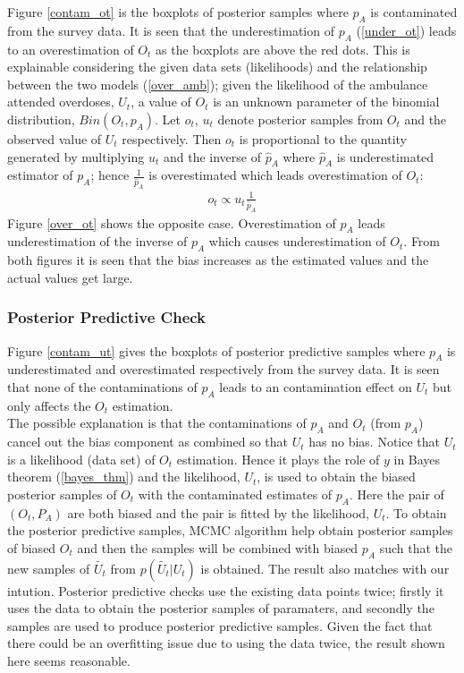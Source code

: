 \documentclass[12pt]{article}
\begin{document}
\normalsize 
Figure \ref{contam_ot} is the boxplots of posterior samples where $p_A$ is contaminated from the survey data. It is seen that the underestimation of $p_A$ (\ref{under_ot}) leads to an overestimation of $O_t$ as the boxplots are above the red dots. This is explainable considering the given data sets (likelihoods) and the relationship between the two models (\ref{over_amb}); given the likelihood of the ambulance attended overdoses, $U_t$, a value of $O_t$ is an unknown parameter of the binomial distribution, $Bin(O_t, p_A)$. Let $o_t$, $u_t$ denote posterior samples from $O_t$ and the observed value of $U_t$ respectively. Then $o_t$ is proportional to the quantity generated by multiplying $u_t$ and the inverse of $\hat{p}_{A}$ where $\hat{p}_{A}$ is underestimated estimator of $p_A$; hence $\frac{1}{\hat{p}_{A}}$ is overestimated which leads overestimation of $O_t$:
\begin{equation}
\label{ot.how.made}
\begin{aligned}
o_t \propto u_t \frac{1}{\hat{p}_{A}}
\end{aligned}
\end{equation}
Figure \ref{over_ot} shows the opposite case. Overestimation of $p_A$ leads underestimation of the inverse of $p_A$ which causes underestimation of $O_t$. From both figures it is seen that the bias increases as the estimated values and the actual values get large.\\

\subsubsection{Posterior Predictive Check}

Figure \ref{contam_ut} gives the boxplots of posterior predictive samples where $p_A$ is underestimated and overestimated respectively from the survey data. It is seen that none of the contaminations of $p_A$ leads to an contamination effect on $U_t$ but only affects the $O_t$ estimation.\\

The possible explanation is that the contaminations of  $p_A$ and $O_t$ (from $p_A$) cancel out the bias component as combined so that $U_t$ has no bias. Notice that $U_t$ is a likelihood (data set) of $O_t$ estimation. Hence it plays the role of $y$ in Bayes theorem (\ref{bayes_thm}) and the likelihood, $U_t$, is used to obtain the biased posterior samples of $O_t$ with the contaminated estimates of $p_A$. Here the pair of $(O_t, P_A)$ are both biased and the pair is fitted by the likelihood, $U_t$. To obtain the posterior predictive samples, MCMC algorithm help obtain posterior samples of biased $O_t$ and then the samples will be combined with biased $p_A$ such that the new samples of $\tilde{U_t}$ from $p(\tilde{U_t}|{U_t})$ is obtained.  The result also matches with our intution. Posterior predictive checks use the existing data points twice; firstly it uses the data to obtain the posterior samples of paramaters, and secondly the samples are used to produce posterior predictive samples. Given the fact that there could be an overfitting issue due to using the data twice, the result shown here seems reasonable. 
\\
\end{document}
